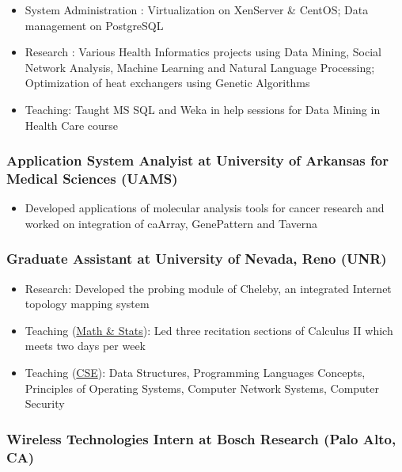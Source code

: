 \documentclass[11pt, letter]{article}
\begin{document}
\begin{raggedright}
\begin{itemize}
\itemsep1pt\parskip0pt
\item
  System Administration : Virtualization on XenServer \& CentOS; Data
  management on PostgreSQL
\item
  Research : Various Health Informatics projects using Data Mining,
  Social Network Analysis, Machine Learning and Natural Language
  Processing; Optimization of heat exchangers using Genetic Algorithms
\item
  Teaching: Taught MS SQL and Weka in help sessions for Data Mining in
  Health Care course
\end{itemize}

\subsubsection{Application System Analyist at University of Arkansas for
Medical Sciences
(UAMS)}\label{application-system-analyist-at-university-of-arkansas-for-medical-sciences-uams}

\begin{itemize}
\itemsep1pt\parskip0pt
\item
  Developed applications of molecular analysis tools for cancer research
  and worked on integration of caArray, GenePattern and Taverna
\end{itemize}

\subsubsection{Graduate Assistant at University of Nevada, Reno
(UNR)}\label{graduate-assistant-at-university-of-nevada-reno-unr}

\begin{itemize}
\itemsep1pt\parskip0pt
\item
  Research: Developed the probing module of Cheleby, an integrated
  Internet topology mapping system
\item
  Teaching (\href{http://www.unr.edu/math/}{Math \& Stats}): Led three
  recitation sections of Calculus II which meets two days per week
\item
  Teaching (\href{http://www.unr.edu/cse/}{CSE}): Data Structures,
  Programming Languages Concepts, Principles of Operating Systems,
  Computer Network Systems, Computer Security
\end{itemize}

\subsubsection{Wireless Technologies Intern at Bosch Research (Palo
Alto,
CA)}\label{wireless-technologies-intern-at-bosch-research-palo-alto-ca}


\end{raggedright}
\end{document}
